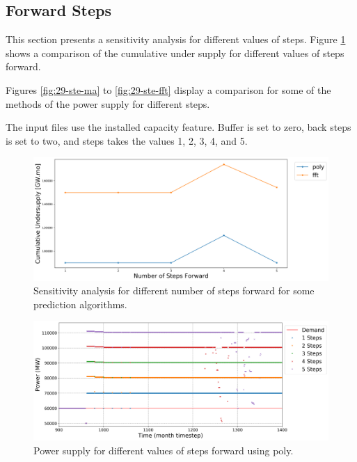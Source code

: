 \documentclass[11pt]{article}
\begin{document}
\subsection{Forward Steps}

This section presents a sensitivity analysis for different values of steps.
Figure \ref{fig:29-steps} shows a comparison of the cumulative under supply for different values of steps forward.

Figures \ref{fig:29-ste-ma} to \ref{fig:29-ste-fft} display a comparison for some of the methods of the power supply for different steps.

The input files use the installed capacity feature. Buffer is set to zero, back steps is set to two, and steps takes the values 1, 2, 3, 4, and 5.

\begin{figure}[H]
	\centering
	\includegraphics[width=\textwidth]{29-figures/29-sens-steps.png} 
	\hfill
	\caption{Sensitivity analysis for different number of steps forward for some prediction algorithms.}
	\label{fig:29-steps}
\end{figure}

\begin{figure}[H]
	\centering
	\includegraphics[width=\textwidth]{29-figures/29-power-buffer0-poly-steps.png} 
	\hfill
	\caption{Power supply for different values of steps forward using poly.}
	\label{fig:29-ste-poly}
\end{figure}
\end{document}
